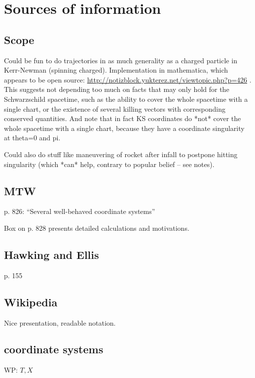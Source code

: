 \documentclass{article}
\begin{document}
\section{Sources of information}

\subsection{Scope}

Could be fun to do trajectories in as much generality as a charged
particle in Kerr-Newman (spinning charged). Implementation in
mathematica, which appears to be open source:
\url{http://notizblock.yukterez.net/viewtopic.php?p=426} .
This suggests not depending too much on facts that may only hold for
the Schwarzschild spacetime, such as the ability to cover the whole
spacetime with a single chart, or the existence of several killing vectors
with corresponding conserved quantities. And note that in fact KS coordinates
do *not* cover the whole spacetime with a single chart, because they have
a coordinate singularity at theta=0 and pi.

Could also do stuff like maneuvering of rocket after infall to postpone hitting singularity
(which *can* help, contrary to popular belief -- see notes).

\subsection{MTW}

p. 826: ``Several well-behaved coordinate systems''

Box on p. 828 presents detailed calculations and motivations.

\subsection{Hawking and Ellis}

p. 155

\subsection{Wikipedia}

Nice presentation, readable notation.

\subsection{coordinate systems}

WP: $T,X$
\end{document}
